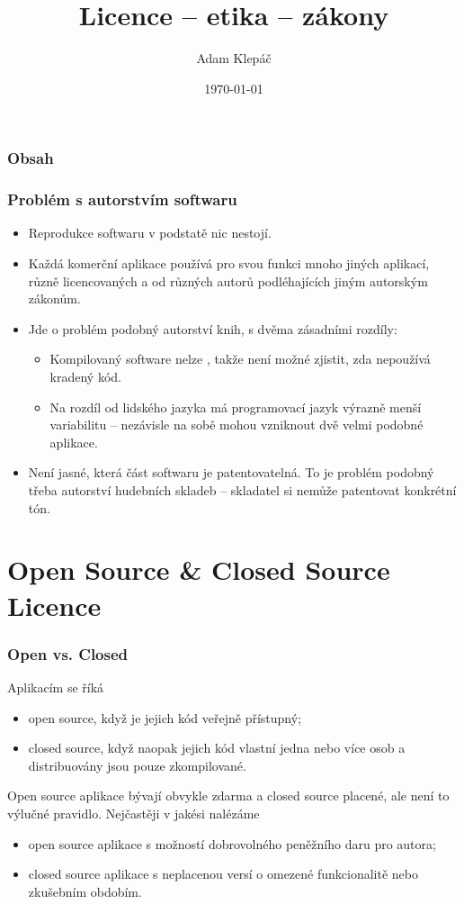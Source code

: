 \documentclass[aspectratio=169,11pt,svgnames,handout]{beamer}
\title{Licence -- etika -- zákony}
\date{\today}
\author{Adam Klepáč}
\institute[GEVO]{Gymnázium Evolution Jižní Město}
\begin{document}
\titleframe

\begin{frame}
\frametitle{Obsah}
\tableofcontents
\end{frame}

\begin{frame}
\frametitle{Problém s autorstvím softwaru}
\begin{itemize}[label=\textbullet]
  \item Reprodukce softwaru v podstatě nic nestojí.
    \pause
  \item Každá komerční aplikace používá pro svou funkci mnoho jiných aplikací,
    různě licencovaných a od různých autorů podléhajících jiným autorským
    zákonům.
    \pause
  \item Jde o problém podobný autorství knih, s dvěma zásadními rozdíly:
    \begin{itemize}[label=$\circ$]
        \pause
      \item Kompilovaný software nelze , takže není možné
        zjistit, zda nepoužívá kradený kód.
        \pause
      \item Na rozdíl od lidského jazyka má programovací jazyk výrazně menší
        variabilitu -- nezávisle na sobě mohou vzniknout dvě velmi podobné
        aplikace.
    \end{itemize}
    \pause
  \item Není jasné, která část softwaru je patentovatelná. To je problém
    podobný třeba autorství hudebních skladeb -- skladatel si nemůže patentovat
    konkrétní tón.
\end{itemize}
\end{frame}

\section{Open Source \& Closed Source\\Licence}
\label{sec:open-source-a-closed-source}

\begin{frame}
\frametitle{Open vs. Closed}
Aplikacím se říká
\begin{itemize}[label=\textbullet]
  \item \alert{open source}, když je jejich kód veřejně přístupný;
    \pause
  \item \alert{closed source}, když naopak jejich kód vlastní jedna nebo více
    osob a distribuovány jsou pouze zkompilované.
\end{itemize}
\pause
Open source aplikace bývají obvykle zdarma a closed source placené, ale není
to výlučné pravidlo. Nejčastěji v jakési  nalézáme
\pause
\begin{itemize}[label=\textbullet]
  \item open source aplikace s možností dobrovolného peněžního daru pro autora;
    \pause
  \item closed source aplikace s neplacenou versí o omezené funkcionalitě nebo
    zkušebním obdobím.
\end{itemize}
\end{frame}
\end{document}
